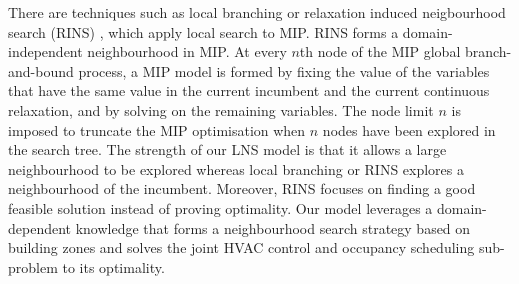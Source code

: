 There are techniques such as local branching or relaxation induced neigbourhood search (RINS) \citep{danna2005exploring,danna2003structured}, which apply local search to MIP. RINS forms a domain-independent neighbourhood in MIP. At every $n$th node of the MIP global branch-and-bound process, a MIP model is formed by fixing the value of the variables that have the same value in the current incumbent and the current continuous relaxation, and by solving on the remaining variables. The node limit $n$ is imposed to truncate the MIP optimisation when $n$ nodes have been explored in the search tree. 
The strength of our LNS model is that it allows a large neighbourhood to be explored whereas local branching or RINS explores a neighbourhood of the incumbent. Moreover, RINS focuses on finding a good feasible solution instead of proving optimality. Our model leverages a domain-dependent knowledge that forms a neighbourhood search strategy based on building zones and solves the joint HVAC control and occupancy scheduling sub-problem to its optimality.

